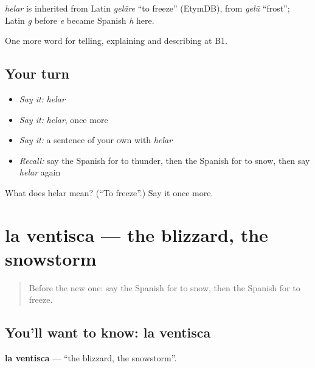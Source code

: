 \begin{cousinweb}
\emph{helar} is inherited from Latin \emph{gelāre} \textquotedblleft{}to freeze\textquotedblright{} (EtymDB), from \emph{gelū} \textquotedblleft{}frost\textquotedblright{}; Latin \emph{g} before \emph{e} became Spanish \emph{h} here.
\end{cousinweb}

\begin{grammarlens}[title={What you've built}]
One more word for telling, explaining and describing at B1.
\end{grammarlens}

\subsection*{Your turn}
\begin{itemize}
\raggedright
  \item \emph{Say it:} \emph{helar}
  \item \emph{Say it:} \emph{helar}, once more
  \item \emph{Say it:} a sentence of your own with \emph{helar}
  \item \emph{Recall:} say the Spanish for to thunder, then the Spanish for to snow, then say \emph{helar} again
\end{itemize}

\begin{tcolorbox}[breakable,colback=teal!4,colframe=teal!35!black,title={Before you move on}]
What does helar mean? (\textquotedblleft{}To freeze\textquotedblright{}.) Say it once more.
\end{tcolorbox}
\section[la ventisca]{la ventisca — the blizzard, the snowstorm}

\label{lesson:ES-C700-ventisca}



\begin{quote}
Before the new one: say the Spanish for to snow, then the Spanish for to freeze.
\end{quote}

\subsection*{You'll want to know: la ventisca}
\textbf{la ventisca} — \textquotedblleft{}the blizzard, the snowstorm\textquotedblright{}.


